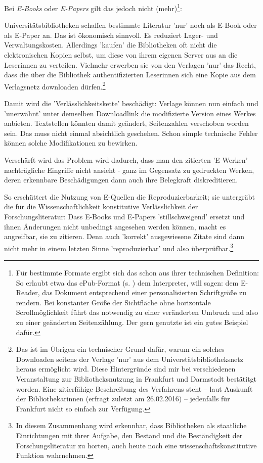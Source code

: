 Bei \emph{E-Books} oder \emph{E-Papers} gilt das jedoch nicht (mehr)\footnote{Für bestimmte Formate ergibt sich das schon aus ihrer technischen Definition: So erlaubt etwa das ePub-Format (s. ) dem Interpreter, will sagen: dem E-Reader, das Dokument entsprechend einer personalisierten Schriftgröße zu rendern. Bei konstanter Größe der Sichtfläche ohne horizontale Scrollmöglichkeit führt das notwendig zu einer veränderten Umbruch und also zu einer geänderten Seitenzählung. Der gern genutzte  ist ein gutes Beispiel dafür.}:

Universitätsbibliotheken schaffen bestimmte Literatur 'nur' noch als E-Book oder als E-Paper an. Das ist ökonomisch sinnvoll. Es reduziert Lager- und Verwaltungskosten. Allerdings 'kaufen' die Bibliotheken oft nicht die elektronischen Kopien selbst, um diese von ihrem eigenen Server aus an die Leserinnen zu verteilen. Vielmehr erwerben sie von den Verlagen 'nur' das Recht, dass die über die Bibliothek authentifizierten Leserinnen sich eine Kopie aus dem Verlagsnetz downloaden dürfen.\footnote{Das ist im Übrigen ein technischer Grund dafür, warum ein solches Downloaden seitens der Verlage 'nur' aus dem Universtätsbibliotheksnetz heraus ermöglicht wird. Diese Hintergründe sind mir bei verschiedenen Veranstaltung zur Bibliotheksnutzung in Frankfurt und Darmstadt bestätitgt worden. Eine zitierfähige Beschreibung des Verfahrens steht -- laut Auskunft der Bibliothekarinnen (erfragt zuletzt am 26.02.2016) -- jedenfalls für Frankfurt nicht so einfach zur Verfügung.}

Damit wird die 'Verlässlichkeitskette' beschädigt: Verlage können nun einfach und 'unerwähnt' unter demselben Downloadlink die modifizierte Version eines Werkes anbieten. Textstellen könnten damit geändert, Seitenzahlen verschoben worden sein. Das muss nicht einmal absichtlich geschehen. Schon simple technische Fehler können solche Modifikationen zu bewirken.

Verschärft wird das Problem wird dadurch, dass man den zitierten 'E-Werken' nachträgliche Eingriffe nicht ansieht - ganz im Gegensatz zu gedruckten Werken, deren erkennbare Beschädigungen dann auch ihre Belegkraft diskreditieren.

So erschüttert die Nutzung von E-Quellen die Reproduzierbarkeit; sie untergräbt die für die Wissenschaftlichkeit konstitutive Verlässlichkeit der Forschungsliteratur: Dass E-Books und E-Papers 'stillschweigend' ersetzt und ihnen Änderungen nicht unbedingt angesehen werden können, macht es angreifbar, sie zu zitieren. Denn auch 'korrekt' ausgewiesene Zitate sind dann nicht mehr in einem letzten Sinne 'reproduzierbar' und also überprüfbar.\footnote{In diesem Zusammenhang wird erkennbar, dass Bibliotheken als staatliche Einrichtungen mit ihrer Aufgabe, den Bestand und die Beständigkeit der Forschungsliteratur zu horten, auch heute noch eine wissenschaftskonstitutive Funktion wahrnehmen.}


